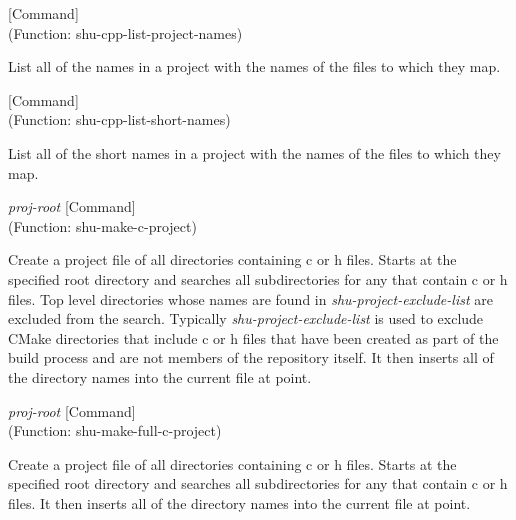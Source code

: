 \vspace{1em}
\noindent
{}
\usebox{\funcname}
 \hfill [Command]\\%
 (Function: shu-cpp-list-project-names)

\begin{doc-string}
List all of the names in a project with the names of the files to
which they map.
\end{doc-string}

\vspace{1em}
\noindent
{}
\usebox{\funcname}
 \hfill [Command]\\%
 (Function: shu-cpp-list-short-names)

\begin{doc-string}
List all of the short names in a project with the names of the files to
which they map.
\end{doc-string}

\vspace{1em}
\noindent
{}
\usebox{\funcname}\emph{proj-root}
 \hfill [Command]\\%
 (Function: shu-make-c-project)

\begin{doc-string}
Create a project file of all directories containing c or h files.  Starts at
the specified root directory and searches all subdirectories for any that
contain c or h files.  Top level directories whose names are found in
\emph{shu-project-exclude-list} are excluded from the search.  Typically
\emph{shu-project-exclude-list} is used to exclude CMake directories that include c or
h files that have been created as part of the build process and are not members
of the repository itself.  It then inserts all of the directory names into the
current file at point.
\end{doc-string}

\vspace{1em}
\noindent
{}
\usebox{\funcname}\emph{proj-root}
 \hfill [Command]\\%
 (Function: shu-make-full-c-project)

\begin{doc-string}
Create a project file of all directories containing c or h files.
Starts at the specified root directory and searches all subdirectories for
any that contain c or h files.  It then inserts all of the directory names
into the current file at point.
\end{doc-string}

